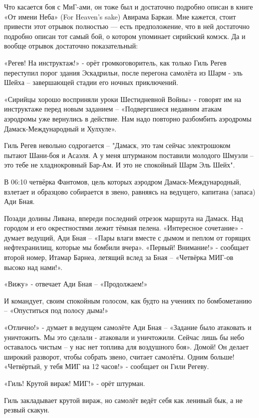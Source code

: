 Что касается боя с МиГ-ами, он тоже был и достаточно подробно описан в книге «От имени Неба» (For Heaven's sake) Авирама Баркаи. Мне кажется, стоит привести этот отрывок полностью — есть предположение, что в ней достаточно подробно описан тот самый бой, о котором упоминает сирийский комэск. Да и вообще отрывок достаточно показательный:

\begin{textcitation}
	«Регев! На инструктаж!» - орёт громкоговоритель, как только Гиль Регев переступил порог здания Эскадрильи, после перегона самолёта из Шарм - эль Шейха – завершающей стадии его ночных приключений. 
	
	«Сирийцы хорошо восприняли уроки Шестидневной Войны» - говорят им на инструктаже перед новым заданием – «Подвергшиеся недавним атакам аэродромы уже вернулись в действие. Нам надо повторно разбомбить аэродромы Дамаск-Международный и Хулхуле». 
	
	Гиль Регев невольно содрогается – "Дамаск, это там сейчас электрошоком пытают Шани-боя и Асаэля. А у меня штурманом поставили молодого Шмуэли – это тебе не хладнокровный Бар-Ам. И это не спокойный Шарм Эль Шейх". 
	
	В 06:10 четвёрка Фантомов, цель которых аэродром Дамаск-Международный, взлетает и образцово собирается в звено, равняясь на ведущего, капитана (запаса) Ади Бная. 
	
	Позади долины Ливана, впереди последний отрезок маршрута на Дамаск. Над городом и его окрестностями лежит тёмная пелена.
	«Интересное сочетание» - думает ведущий, Ади Бная – «Пары влаги вместе с дымом и пеплом от горящих нефтехранилищ, которые мы бомбили вчера».
	«Первый! Внимание!» - сообщает второй номер, Итамар Барнеа, летящий вслед за Бная – «Четвёрка МИГ-ов высоко над нами!». 
	
	«Вижу» - отвечает Ади Бная – «Продолжаем!» 
	
	И командует, своим спокойным голосом, как будто на учениях по бомбометанию – «Опуститься под полосу дыма!» 
	
	«Отлично!» - думает в ведущем самолёте Ади Бная – «Задание было атаковать и уничтожить. Мы это сделали - атаковали и уничтожили. Сейчас лишь бы небо оставалось чистым – у нас нет топлива для воздушного боя».
	Домой! Он делает широкий разворот, чтобы собрать звено, считает самолёты. Одним больше! «Четвёртый, у тебя МИГ на 12 часов!» - сообщает он Гили Регеву.
	
	«Гиль! Крутой вираж! МИГ!» - орёт штурман. 
	
	Гиль закладывает крутой вираж, но самолёт ведёт себя как ленивый бык, а не резвый скакун. 
	

\end{textcitation}
